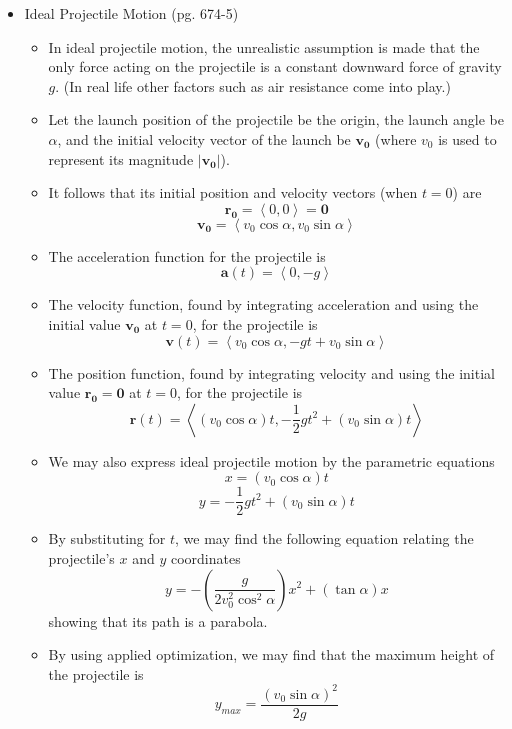 \documentclass[12pt]{article}
\theoremstyle{plain}
\theoremstyle{definition}
\theoremstyle{remark}
\newcommand{\vect}[1]{\mathbf{#1}}
\begin{document}
\begin{itemize}
		\item Ideal Projectile Motion (pg. 674-5)
			\begin{itemize}
			\item In ideal projectile motion, the unrealistic assumption is made that the only force acting on the projectile is a constant downward force of gravity $g$. (In real life other factors such as air resistance come into play.)
			\item Let the launch position of the projectile be the origin, the launch angle be $\alpha$, and the initial velocity vector of the launch be $\vect{v_0}$ (where $v_0$ is used to represent its magnitude $|\vect{v_0}|$).
			\item It follows that its initial position and velocity vectors (when $t=0$) are \[\vect{r_0} = \left<0,0\right> = \vect{0}\] \[\vect{v_0} = \left<v_0\cos\alpha,v_0\sin\alpha\right>\]
			\item The acceleration function for the projectile is \[\vect{a}(t) = \left<0,-g\right>\]
			\item The velocity function, found by integrating acceleration and using the initial value $\vect{v_0}$ at $t=0$, for the projectile is \[\vect{v}(t) = \left<v_0\cos\alpha,-gt+v_0\sin\alpha\right>\]
			\item The position function, found by integrating velocity and using the initial value $\vect{r_0}=\vect{0}$ at $t=0$, for the projectile is \[\vect{r}(t) = \left<(v_0\cos\alpha)t,-\frac{1}{2}gt^2+(v_0\sin\alpha)t\right>\]
			\item We may also express ideal projectile motion by the parametric equations \[x=(v_0\cos\alpha)t\] \[y=-\frac{1}{2}gt^2+(v_0\sin\alpha)t\]
			
			\item By substituting for $t$, we may find the following equation relating the projectile's $x$ and $y$ coordinates \[y = -\left(\frac{g}{2v_0^2\cos^2\alpha}\right)x^2+(\tan\alpha)x\] showing that its path is a parabola.
			
			\item By using applied optimization, we may find that the maximum height of the projectile is \[y_{max} = \frac{(v_0\sin\alpha)^2}{2g}\]
			

\end{itemize}
\end{itemize}
\end{document}
